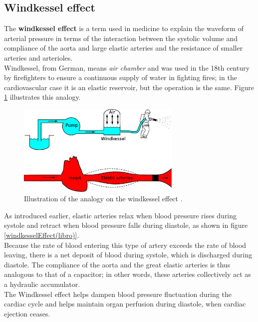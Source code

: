 \subsection{Windkessel effect}
The \textbf{windkessel effect} is a term used in medicine to explain the waveform of arterial pressure in terms of the interaction between the systolic volume and compliance of the aorta and large elastic arteries and the resistance of smaller arteries and arterioles.\\
Windkessel, from German, means \textit{air chamber} and was used in the 18th century by firefighters to ensure a continuous supply of water in fighting fires; in the cardiovascular case it is an elastic reservoir, but the operation is the same. Figure \ref{windkesselEffect} illustrates this analogy.

\begin{figure}[h]
    \centering
    \includegraphics[width=0.7\textwidth]{images/Windkessel/WindkesselEffect.png}
    \caption{Illustration of the analogy on the windkessel effect \cite{wiki:WindkesselEffect}.}
    \label{windkesselEffect}
\end{figure}

\newpage
As introduced earlier, elastic arteries relax when blood pressure rises during systole and retract when blood pressure falls during diastole, as shown in figure \ref{windkesselEffect(libro)}. \\
Because the rate of blood entering this type of artery exceeds the rate of blood leaving, there is a net deposit of blood during systole, which is discharged during diastole. The compliance of the aorta and the great elastic arteries is thus analogous to that of a capacitor; in other words, these arteries collectively act as a hydraulic accumulator.\\
The Windkessel effect helps dampen blood pressure fluctuation during the cardiac cycle and helps maintain organ perfusion during diastole, when cardiac ejection ceases. 


